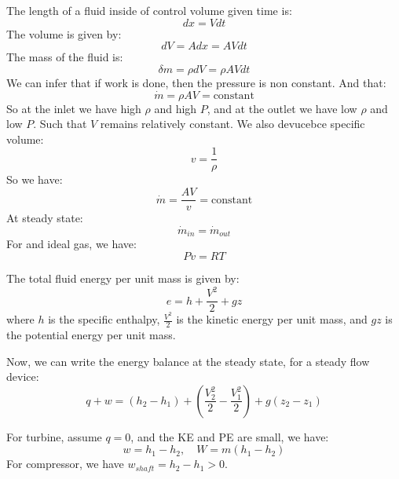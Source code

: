\documentclass[11pt]{report}
\begin{document}
\begin{example}
    The length of a fluid inside of control volume given time is:
    $$
        dx = V dt
    $$
    The volume is given by:
    $$
        dV = A dx = A V dt
    $$
    The mass of the fluid is:
    $$
        \delta m = \rho dV = \rho A V dt
    $$
    We can infer that if work is done, then the pressure is non constant. And that:
    $$
        \dot{m} = \rho A V = \text{constant}
    $$
    So at the inlet we have high $\rho$ and high $P$, and at the outlet we have low $\rho$ and low $P$. Such that $V$ remains relatively constant. We also devucebce specific volume:
    \begin{equation}
        v = \frac{1}{\rho}
    \end{equation}
    So we have:
    \begin{equation}
        \dot{m} = \frac{A V}{v} = \text{constant}
    \end{equation}
    At steady state:
    \begin{equation}
        \dot{m}_{in} = \dot{m}_{out}
    \end{equation}
    For and ideal gas, we have:
    \begin{equation}
        Pv = RT
    \end{equation}
\end{example}
\begin{definition}
    The total fluid energy per unit mass is given by:
    \begin{equation}
        e = h + \frac{V^2}{2} + gz
    \end{equation}
    where $h$ is the specific enthalpy, $\frac{V^2}{2}$ is the kinetic energy per unit mass, and $gz$ is the potential energy per unit mass.

    Now, we can write the energy balance at the steady state, for a steady flow device:
    \begin{equation}
        q + w = (h_2 - h_1) + \left(\frac{V_2^2}{2} - \frac{V_1^2}{2}\right) + g(z_2 - z_1)
    \end{equation}

    For turbine, assume $q = 0$, and the KE and PE are small, we have:
    \begin{equation}
        w = h_1 - h_2, \quad W = m(h_1 - h_2)
    \end{equation}
    For compressor, we have $w_{shaft} = h_2 - h_1 > 0$.

\end{definition}
\end{document}
